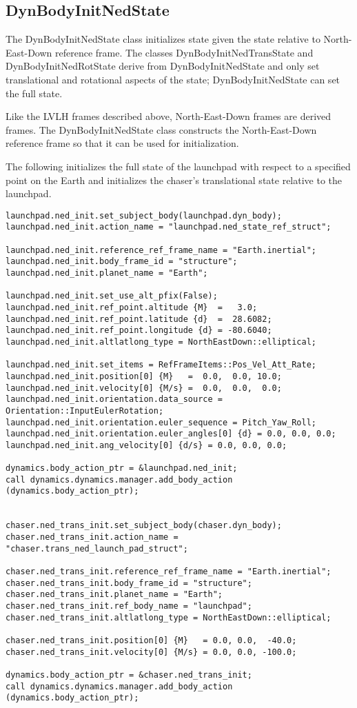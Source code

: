 \subsection{DynBodyInitNedState}

The DynBodyInitNedState class initializes state
given the state relative to North-East-Down reference frame.
The classes DynBodyInitNedTransState and DynBodyInitNedRotState
derive from DynBodyInitNedState and only set translational and
rotational aspects of the state; DynBodyInitNedState can set the
full state.

Like the LVLH frames described above,
North-East-Down frames are derived frames.
The DynBodyInitNedState class
constructs the North-East-Down reference frame
so that it can be used for initialization.

The following initializes the full state of the launchpad
with respect to a specified point on the Earth
and initializes the chaser's translational state relative to the launchpad.

\begin{verbatim}
launchpad.ned_init.set_subject_body(launchpad.dyn_body);
launchpad.ned_init.action_name = "launchpad.ned_state_ref_struct";

launchpad.ned_init.reference_ref_frame_name = "Earth.inertial";
launchpad.ned_init.body_frame_id = "structure";
launchpad.ned_init.planet_name = "Earth";

launchpad.ned_init.set_use_alt_pfix(False);
launchpad.ned_init.ref_point.altitude {M}  =   3.0;
launchpad.ned_init.ref_point.latitude {d}  =  28.6082;
launchpad.ned_init.ref_point.longitude {d} = -80.6040;
launchpad.ned_init.altlatlong_type = NorthEastDown::elliptical;

launchpad.ned_init.set_items = RefFrameItems::Pos_Vel_Att_Rate;
launchpad.ned_init.position[0] {M}   =  0.0,  0.0, 10.0;
launchpad.ned_init.velocity[0] {M/s} =  0.0,  0.0,  0.0;
launchpad.ned_init.orientation.data_source = Orientation::InputEulerRotation;
launchpad.ned_init.orientation.euler_sequence = Pitch_Yaw_Roll;
launchpad.ned_init.orientation.euler_angles[0] {d} = 0.0, 0.0, 0.0;
launchpad.ned_init.ang_velocity[0] {d/s} = 0.0, 0.0, 0.0;

dynamics.body_action_ptr = &launchpad.ned_init;
call dynamics.dynamics.manager.add_body_action (dynamics.body_action_ptr);


chaser.ned_trans_init.set_subject_body(chaser.dyn_body);
chaser.ned_trans_init.action_name = "chaser.trans_ned_launch_pad_struct";

chaser.ned_trans_init.reference_ref_frame_name = "Earth.inertial";
chaser.ned_trans_init.body_frame_id = "structure";
chaser.ned_trans_init.planet_name = "Earth";
chaser.ned_trans_init.ref_body_name = "launchpad";
chaser.ned_trans_init.altlatlong_type = NorthEastDown::elliptical;

chaser.ned_trans_init.position[0] {M}   = 0.0, 0.0,  -40.0;
chaser.ned_trans_init.velocity[0] {M/s} = 0.0, 0.0, -100.0;

dynamics.body_action_ptr = &chaser.ned_trans_init;
call dynamics.dynamics.manager.add_body_action (dynamics.body_action_ptr);
\end{verbatim}

